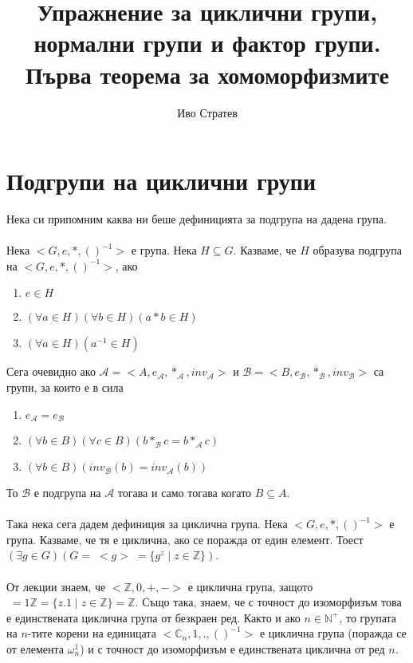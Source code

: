 \documentclass[12pt]{article}
\title{Упражнение за циклични групи, нормални групи и фактор групи. Първа теорема за хомоморфизмите}
\author{Иво Стратев}
\begin{document}
\maketitle
\tableofcontents
\newpage

\section{Подгрупи на циклични групи}
Нека си припомним каква ни беше дефиницията за подгрупа на дадена група.
\\
\vspace{2mm}
\\
Нека \(<G, e, *, ()^{-1}>\) е група. Нека \(H \subseteq G\).
Казваме, че \(H\) образува подгрупа на \(<G, e, *, ()^{-1}>\), ако
\begin{enumerate}
    \item \(e \in H\)
    \item \((\forall a \in H)(\forall b \in H)(a * b \in H)\)
    \item \((\forall a \in H)(a^{-1} \in H)\)
\end{enumerate}

Сега очевидно ако \(\mathcal{A} = <A, e_\mathcal{A}, *_\mathcal{A}, inv_\mathcal{A}>\)
и \(\mathcal{B} = <B, e_\mathcal{B}, *_\mathcal{B}, inv_\mathcal{B}>\) са групи,
за които е в сила
\begin{enumerate}
    \item \(e_\mathcal{A} = e_\mathcal{B}\)
    \item \((\forall b \in B)(\forall c \in B)(b *_\mathcal{B} c = b *_\mathcal{A} c)\)
    \item \((\forall b \in B)(inv_\mathcal{B}(b) = inv_\mathcal{A}(b))\)
\end{enumerate}

То \(\mathcal{B}\) е подгрупа на \(\mathcal{A}\) тогава и само тогава когато  \(B \subseteq A\).
\\
\vspace{2mm}
\\
Така нека сега дадем дефиниция за циклична група.
Нека \(<G, e, *, ()^{-1}>\) е група.
Казваме, че тя е циклична, ако се поражда от един елемент. Тоест
\((\exists g \in G)(G = \; <g> \; = \{g^z \; | \; z \in \mathbb{Z}\})\).
\\
\vspace{2mm}
\\
От лекции знаем, че \(<\mathbb{Z}, 0, +, ->\) е циклична група,
защото \(<1> \; = 1\mathbb{Z} = \{z.1 \; | \; z \in \mathbb{Z}\} = \mathbb{Z}\).
Също така, знаем, че с точност до изоморфизъм това е единствената циклична група от безкраен ред.
Както и ако \(n \in \mathbb{N}^+\), то групата на \(n\)-тите корени на единицата
\(<\mathbb{C}_n, 1, . , ()^{-1}>\) е циклична група (поражда се от елемента \(\omega_n^1\)) и с точност до изоморфизъм е единствената циклична от ред \(n\).
\end{document}
